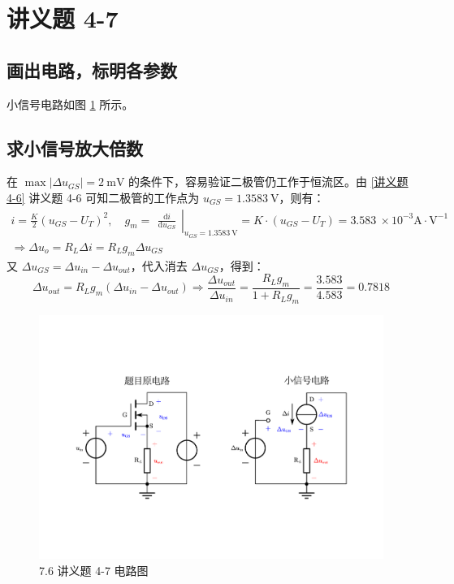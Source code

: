 \documentclass[UTF8]{report}
\def\mV{\ \mathrm{mV}}
\theoremstyle{MyLineTheoremStyle} %
\theoremstyle{MyBlockTheoremStyle} %
\theoremstyle{MySubsubsectionStyle} %
\begin{document}
\section{讲义题 4-7}

\subsection{画出电路，标明各参数}
小信号电路如图 \ref{7.6 讲义题 4-7 电路图} 所示。

\subsection{求小信号放大倍数}

在 $\max | \Delta u_{GS} | = 2 \mV$ 的条件下，容易验证二极管仍工作于恒流区。由 \ref{讲义题 4-6} 讲义题 4-6 可知二极管的工作点为 $u_{GS} = 1.3583 \ \mathrm{V}$，则有：
\begin{gather}
i = \frac{K}{2}\left(u_{GS} - U_T\right)^2,\quad 
g_m = 
\left.\begin{matrix}
    \frac{\mathrm{d} i }{\mathrm{d} u_{GS} } 
\end{matrix}\right|_{u_{GS} = 1.3583 \ \mathrm{V}} = K\cdot(u_{GS} - U_T) = 3.583 \ \times 10^{-3} \mathrm{A\cdot V^{-1}} \\ 
\Longrightarrow 
\Delta u_o = R_L \Delta i = R_L g_m\Delta u_{GS}
\end{gather}
又 $\Delta u_{GS} = \Delta u_{in} - \Delta u_{out}$，代入消去 $\Delta u_{GS}$，得到：
\begin{equation}
\Delta u_{out} = R_L g_m\left(\Delta u_{in} - \Delta u_{out}\right) \Longrightarrow \frac{\Delta u_{out}}{\Delta u_{in}} = \frac{R_L g_m}{1 + R_L g_m} = \frac{3.583}{4.583} = 0.7818
\end{equation}

\begin{figure}[H]\centering
\includegraphics[width=0.8\columnwidth]{assets/7/讲义题4-7.pdf}
\caption{7.6 讲义题 4-7 电路图}\label{7.6 讲义题 4-7 电路图}
\end{figure}
\end{document}
